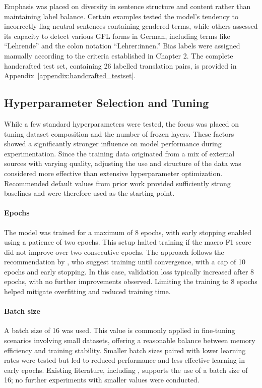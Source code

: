     Emphasis was placed on diversity in sentence structure and content rather than maintaining label balance. Certain examples tested the model's tendency to incorrectly flag neutral sentences containing gendered terms, while others assessed its capacity to detect various GFL forms in German, including terms like “Lehrende” and the colon notation “Lehrer:innen.” Bias labels were assigned manually according to the criteria established in Chapter 2. The complete handcrafted test set, containing 26 labelled translation pairs, is provided in Appendix~\ref{appendix:handcrafted_testset}.

\subsection{Hyperparameter Selection and Tuning} \label{subsection:hyperparameter_tuning_methodology}
     While a few standard hyperparameters were tested, the focus was placed on tuning dataset composition and the number of frozen layers. These factors showed a significantly stronger influence on model performance during experimentation. Since the training data originated from a mix of external sources with varying quality, adjusting the use and structure of the data was considered more effective than extensive hyperparameter optimization. Recommended default values from prior work provided sufficiently strong baselines and were therefore used as the starting point.

    \paragraph{Epochs} The model was trained for a maximum of 8 epochs, with early stopping enabled using a patience of two epochs. This setup halted training if the macro F1 score did not improve over two consecutive epochs. The approach follows the recommendation by \textcite{pecherComparingSpecialisedSmall2024}, who suggest training until convergence, with a cap of 10 epochs and early stopping. In this case, validation loss typically increased after 8 epochs, with no further improvements observed. Limiting the training to 8 epochs helped mitigate overfitting and reduced training time.

    \paragraph{Batch size} A batch size of 16 was used. This value is commonly applied in fine-tuning scenarios involving small datasets, offering a reasonable balance between memory efficiency and training stability. Smaller batch sizes paired with lower learning rates were tested but led to reduced performance and less effective learning in early epochs. Existing literature, including \textcite{mosbachStabilityFinetuningBERT2021}, supports the use of a batch size of 16; no further experiments with smaller values were conducted.

